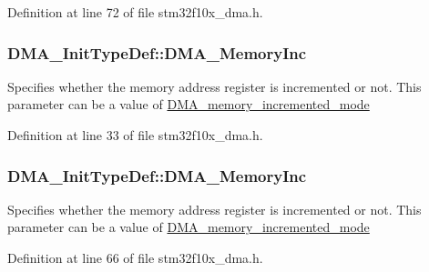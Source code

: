 Definition at line 72 of file stm32f10x\+\_\+dma.\+h.

\subsubsection[{\texorpdfstring{D\+M\+A\+\_\+\+Memory\+Inc}{DMA_MemoryInc}}]{ D\+M\+A\+\_\+\+Init\+Type\+Def\+::\+D\+M\+A\+\_\+\+Memory\+Inc}\hypertarget{struct_d_m_a___init_type_def_a980fa522d1f161bce5d0ebc853cf0c24}{}\label{struct_d_m_a___init_type_def_a980fa522d1f161bce5d0ebc853cf0c24}
Specifies whether the memory address register is incremented or not. This parameter can be a value of \hyperlink{group___d_m_a__memory__incremented__mode}{D\+M\+A\+\_\+memory\+\_\+incremented\+\_\+mode} 

Definition at line 33 of file stm32f10x\+\_\+dma.\+h.

\subsubsection[{\texorpdfstring{D\+M\+A\+\_\+\+Memory\+Inc}{DMA_MemoryInc}}]{ D\+M\+A\+\_\+\+Init\+Type\+Def\+::\+D\+M\+A\+\_\+\+Memory\+Inc}\hypertarget{struct_d_m_a___init_type_def_aaf69c680a297ec01a2ed613289e691a1}{}\label{struct_d_m_a___init_type_def_aaf69c680a297ec01a2ed613289e691a1}
Specifies whether the memory address register is incremented or not. This parameter can be a value of \hyperlink{group___d_m_a__memory__incremented__mode}{D\+M\+A\+\_\+memory\+\_\+incremented\+\_\+mode} 

Definition at line 66 of file stm32f10x\+\_\+dma.\+h.

